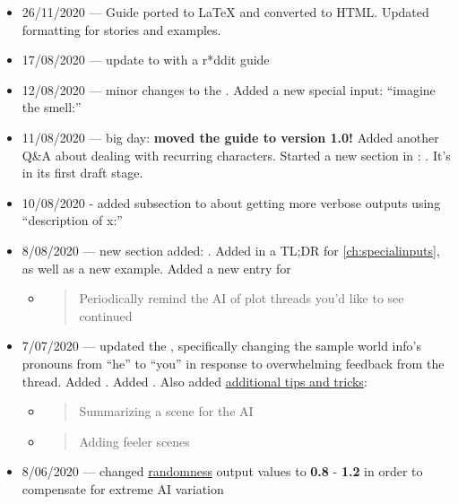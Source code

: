\documentclass[Avsfag-main.tex]{subfiles}
\begin{document}
\begin{itemize}
\item
  26/11/2020 — Guide ported to LaTeX and converted to HTML. Updated formatting for stories and \wi examples.
\item
  17/08/2020 --- update to  with a r*ddit guide
\item
  12/08/2020 --- minor changes to the .
  Added a new special input: ``imagine the smell:''
\item
  11/08/2020 --- big day: \textbf{moved the guide to version 1.0!} Added
  another Q\&A about dealing with recurring characters. Started a new
  section in :
  . It's in its first draft stage.
\item
  10/08/2020 - added subsection to  about getting more verbose outputs using ``description of x:''
\item
  8/08/2020 --- new section added: .
  Added in a TL;DR for \cref{ch:specialinputs}, as well as a new example. Added a new entry for

  \begin{itemize}
  \item
    \begin{quote}
    Periodically remind the AI of plot threads you'd like to see
    continued
    \end{quote}
  \end{itemize}
\item
  7/07/2020 --- updated the , specifically changing the sample world info's pronouns
  from ``he'' to ``you'' in response to overwhelming feedback from the
  thread. Added . Added . Also
  added \hyperref[sec:tips]{additional tips and tricks}:

  \begin{itemize}
  \item
    \begin{quote}
    Summarizing a scene for the AI
    \end{quote}
  \item
    \begin{quote}
    Adding feeler scenes
    \end{quote}
  \end{itemize}
\item
	8/06/2020 --- changed \hyperref[sec:random]{randomness} output
  values to \textbf{0.8} - \textbf{1.2} in order to compensate for
  extreme AI variation
\end{itemize}
\end{document}
